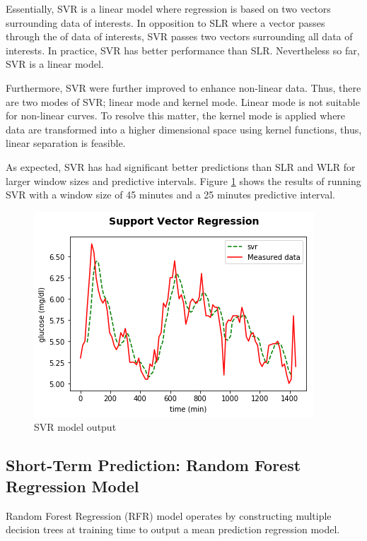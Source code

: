 Essentially, SVR is a linear model where regression is based on two vectors surrounding data of interests. In opposition to SLR where a vector passes through the of data of interests, SVR passes two vectors surrounding all data of interests. In practice, SVR has better performance than SLR. Nevertheless so far, SVR is a linear model.

Furthermore, SVR were further improved to enhance non-linear data. Thus, there are two modes of SVR; linear mode and kernel mode. Linear mode is not suitable for non-linear curves. To resolve this matter, the kernel mode is applied where data are transformed into a higher dimensional space using kernel functions, thus, linear separation is feasible.

As expected, SVR has had significant better predictions than SLR and WLR for larger window sizes and predictive intervals. Figure \ref{svr-fig} shows the results of running SVR with a window size of 45 minutes and a 25 minutes predictive interval.

\begin{center}
\begin{figure}[ht!]
	\centering
    \includegraphics[width=\textwidth]{Figures/mo/svr.png}
 	\caption{SVR model output}
  	\label{svr-fig}
\end{figure}
\end{center}

\subsection{Short-Term Prediction: Random Forest Regression Model}
Random Forest Regression (RFR) model operates by constructing multiple decision trees at training time to output a mean prediction regression model.

